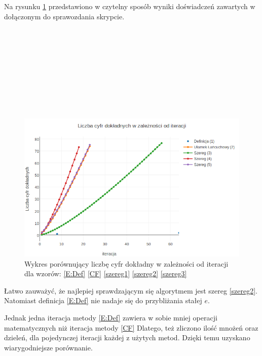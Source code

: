 \documentclass{article}
\begin{document}
Na rysunku \ref{W1} przedstawiono w czytelny sposób wyniki doświadczeń zawartych w dołączonym do sprawozdania skrypcie.
\\\\\\\\\\\\\\\\\\\\
\begin{figure}[h]
\centering
\includegraphics[width= 1 \textwidth]{wykres1.png}
\caption{Wykres porównujący liczbę cyfr dokładny w zależności od iteracji dla wzorów: \eqref{E:Def} \eqref{CF} \eqref{szereg1} \eqref{szereg2} \eqref{szereg3}}
\label{W1}
\end{figure}


Łatwo zauważyć, że najlepiej sprawdzającym się algorytmem jest szereg \eqref{szereg2}. Natomiast definicja \eqref{E:Def} nie nadaje się do przybliżania stałej $e$. 

Jednak jedna iteracja metody \eqref{E:Def} zawiera w sobie mniej operacji matematycznych niż iteracja metody \eqref{CF}
Dlatego, też zliczono ilość mnożeń oraz dzieleń, dla pojedynczej iteracji każdej z użytych metod. Dzięki temu uzyskano wiarygodniejsze porównanie.
\end{document}
